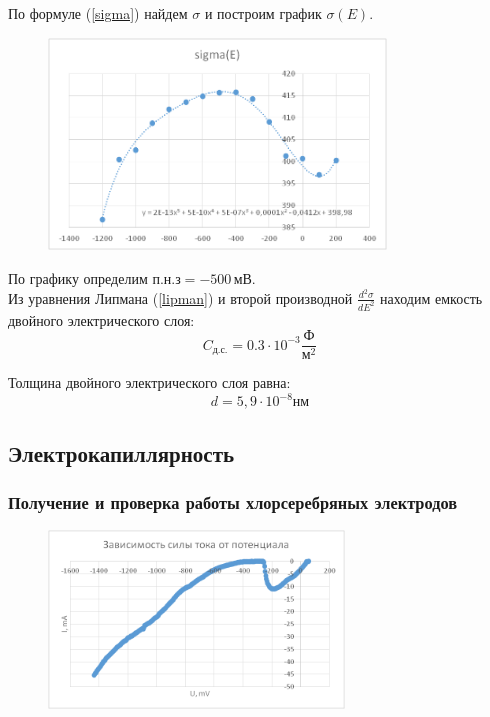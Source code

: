 \documentclass[a4paper, 12pt]{article}
\begin{document}
По формуле (\ref{sigma}) найдем $\sigma$ и построим график $\sigma(E)$.\\

\begin{figure}[!h]
	\centering
	\caption{}
	\includegraphics[width=0.8\textwidth]{image001.png}
\end{figure}
\newpage

По графику определим $\text{п.н.з} = -500\,\text{мВ}.$ \\
Из уравнения Липмана (\ref{lipman}) и второй производной $\frac{d^2\sigma}{dE^2}$ находим емкость двойного электрического слоя:
\[C_\text{д.с.}=0.3 \cdot 10^{-3} \textstyle\frac{\text{Ф}}{\text{м}^2}\]

Толщина двойного электрического слоя равна:
\[d=5,9 \cdot 10^{-8} \text{нм}\]

\subsection{Электрокапиллярность}
\subsubsection*{Получение и проверка работы хлорсеребряных электродов}

\begin{figure}[h!]
	\centering
	\caption{}	\includegraphics[width=0.7\textwidth]{image001(2).png}
\end{figure}
\end{document}

